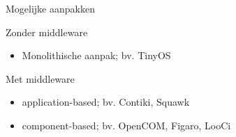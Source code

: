 \documentclass[presentation, bigger]{beamer}
\begin{document}
\begin{frame}[label=sec-2-2]{Mogelijke aanpakken}

  \begin{minipage}{.5\textwidth}
    {\large Zonder middleware}
    \begin{itemize}
    \item Monolithische aanpak; bv. TinyOS
    \end{itemize}
    {\large Met middleware}
    \begin{itemize}
    \item application-based; bv. Contiki, Squawk
    \item component-based; bv. OpenCOM, Figaro, LooCi
    \end{itemize}
    
  \end{minipage}%
  \begin{minipage}{.5\textwidth}
    \centering
    
  \end{minipage}




\end{frame}
\end{document}
